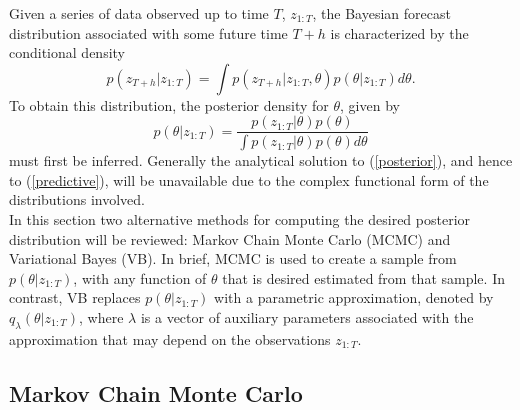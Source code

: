 \documentclass[12pt,a4paper]{article}\usepackage[]{graphicx}\usepackage[]{color}
\begin{document}
Given a series of data observed up to time $T$, $z_{1:T}$, the Bayesian forecast distribution associated with some future time $T+h$ is characterized by the conditional density
\begin{equation}
\label{predictive}
p(z_{T+h} | z_{1:T}) =\int p(z_{T+h}|z_{1:T}, \theta) p(\theta | z_{1:T}) d\theta.
\end{equation}
To obtain this distribution, the posterior density for $\theta$, given by
\begin{equation}
\label{posterior}
 p(\theta | z_{1:T}) = \frac{p(z_{1:T}|\theta)p(\theta)}{\int p(z_{1:T}|\theta)p(\theta) d\theta}
\end{equation}
must first be inferred. Generally the analytical solution to (\ref{posterior}), and hence to (\ref{predictive}), will be unavailable due to the complex functional form of the distributions involved. 
\\

In this section two alternative methods for computing the desired posterior distribution will be reviewed: Markov Chain Monte Carlo (MCMC) and Variational Bayes (VB). In brief, MCMC is used to create a sample from $p(\theta | z_{1:T})$, with any function of $\theta$ that is desired estimated from that sample. In contrast, VB replaces $p(\theta | z_{1:T})$ with a parametric approximation, denoted by $q_{\lambda}(\theta | z_{1:T})$, where $\lambda$ is a vector of auxiliary parameters associated with the approximation that may depend on the observations $z_{1:T}$. 

\subsection{Markov Chain Monte Carlo}
\label{subsec:MCMC}
\end{document}
